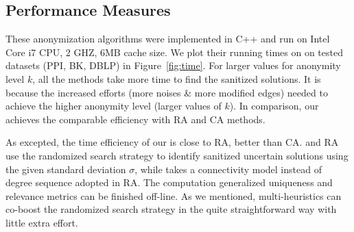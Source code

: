 \subsection{Performance Measures}
These anonymization algorithms were implemented in C++ and run on Intel Core i7 CPU, 2 GHZ, 6MB cache size. We plot their running times on on tested datasets (PPI, BK, DBLP) in Figure~\ref{fig:time}. For larger values for anonymity level $k$, all the methods take more time to find the sanitized solutions. It is because the increased efforts (more noises \& more modified edges) needed to achieve the higher anonymity level (larger values of $k$). 
In comparison, our {\methodName} achieves the comparable efficiency with RA and CA methods.  

As excepted, the time efficiency of our {\methodName} is close to RA, better than CA.
{\methodName} and RA use the randomized search strategy to identify sanitized uncertain solutions using the given standard deviation $\sigma$, while {\methodName} takes a connectivity model instead of degree sequence adopted in RA. 
The computation generalized uniqueness and relevance metrics can be finished off-line.
As we mentioned, multi-heuristics can co-boost the randomized search strategy in the quite straightforward way with little extra effort. 

